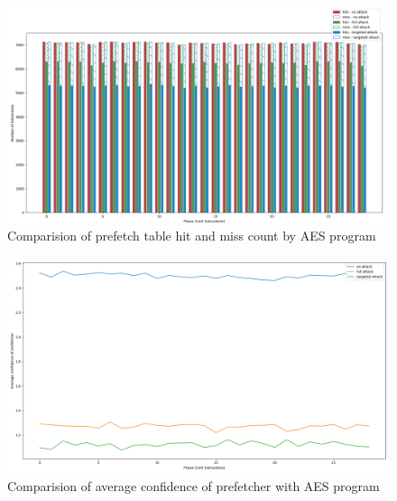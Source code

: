 \begin{figure}[h]
    \centering
    \includegraphics[width=\textwidth]{figures/pf_hits}
    \caption{Comparision of prefetch table hit and miss count by AES program}
    \label{fig:targeted_hitrate}
\end{figure}

\begin{figure}[h]
    \centering
    \includegraphics[width=\textwidth]{figures/avg_conf}
    \caption{Comparision of average confidence of prefetcher with AES program}
    \label{fig:targeted_avgconf}
\end{figure}

